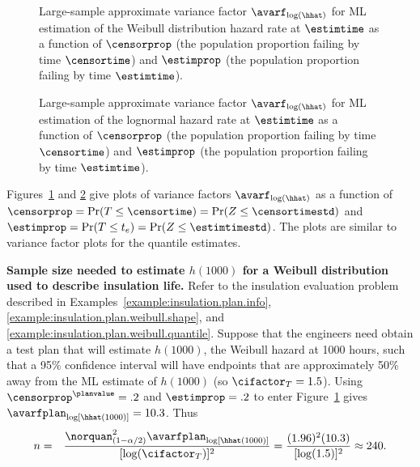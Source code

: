 \begin{figure}
\caption{Large-sample approximate variance factor 
$\avarf_{\log(\hhat)}$ for ML estimation of the Weibull distribution
hazard rate at $\estimtime $ as a function of $\censorprop$ (the
population proportion failing by time $\censortime$) and
$\estimprop$ (the population proportion failing by time
$\estimtime$).}
\label{figure:weib.hazard.avarf.ps}
\end{figure}
\begin{figure}
\caption{Large-sample approximate variance factor 
$\avarf_{\log(\hhat)}$ for ML estimation of the lognormal
hazard rate at $\estimtime $ as a function of $\censorprop$ (the
population proportion failing by time $\censortime$) and
$\estimprop$ (the population proportion failing by time
$\estimtime$).}
\label{figure:lnor.hazard.avarf.ps}
\end{figure}
Figures~\ref{figure:weib.hazard.avarf.ps} and 
\ref{figure:lnor.hazard.avarf.ps} give
plots  of variance factors $\avarf_{\log(\hhat)}$ as
a function of $\censorprop=\Pr(T\leq \censortime)=\Pr(Z \leq  \censortimestd)$ and 
$\estimprop=\Pr(T\leq t_{e})=\Pr(Z \leq \estimtimestd)$.
The plots are similar to variance factor plots for the quantile estimates.

\begin{example}
\label{example:insulation.plan.weibull.hazard}
{\bf Sample size needed to estimate $h(1000)$ for a Weibull
distribution used to describe insulation life.}  Refer to the
insulation evaluation problem described in
Examples~\ref{example:insulation.plan.info},
\ref{example:insulation.plan.weibull.shape}, and
\ref{example:insulation.plan.weibull.quantile}.
Suppose that the engineers need obtain a test plan that will
estimate $h(1000)$, the Weibull hazard at 1000 hours, such that a
95\% confidence interval will have endpoints that are approximately
50\% away from the ML estimate of $h(1000)$ (so
$\cifactor_{T}=1.5$).  Using $\censorprop^{\planvalue}=.2$ and
$\estimprop=.2$ to enter Figure~\ref{figure:weib.hazard.avarf.ps}
gives $\avarfplan_{\log[\hhat(1000)]}=10.3$. Thus
\begin{eqnarray*}
	n&=&\frac{\norquan_{(1-\alpha/2)}^{2} 
	\avarfplan_{\log[\hhat(1000)]}}{[\log(\cifactor_{T})]^2}=
	\frac{(1.96)^{2}(10.3)}{[\log(1.5)]^2} \approx 240.
\end{eqnarray*}
\end{example}

